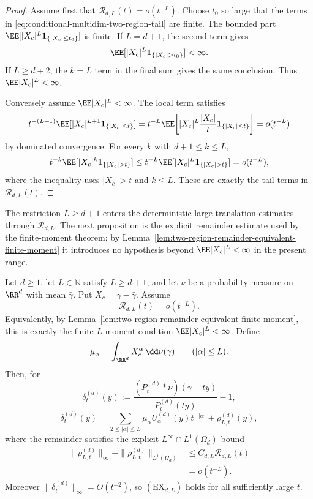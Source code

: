 \begin{proof}
Assume first that \(\mathcal R_{d,L}(t)=o(t^{-L})\).  Choose \(t_0\) so large
that the terms in \eqref{eq:conditional-multidim-two-region-tail} are finite.
The bounded part \(\EE[|X_c|^L{\bf1}_{\{|X_c|\le t_0\}}]\) is finite.  If
\(L=d+1\), the second term gives
\[
\EE[|X_c|^L{\bf1}_{\{|X_c|>t_0\}}]<\infty .
\]
If \(L\ge d+2\), the \(k=L\) term in the final sum gives the same conclusion.
Thus \(\EE|X_c|^L<\infty\).

Conversely assume \(\EE|X_c|^L<\infty\).  The local term satisfies
\[
t^{-(L+1)}\EE[|X_c|^{L+1}{\bf1}_{\{|X_c|\le t\}}]
=t^{-L}\EE\!\left[
|X_c|^L\frac{|X_c|}{t}{\bf1}_{\{|X_c|\le t\}}
\right]
=o(t^{-L})
\]
by dominated convergence.  For every \(k\) with \(d+1\le k\le L\),
\[
t^{-k}\EE[|X_c|^k{\bf1}_{\{|X_c|>t\}}]
\le
t^{-L}\EE[|X_c|^L{\bf1}_{\{|X_c|>t\}}]
=o(t^{-L}),
\]
where the inequality uses \(|X_c|>t\) and \(k\le L\).  These are exactly the
tail terms in \(\mathcal R_{d,L}(t)\).
\end{proof}

The restriction \(L\ge d+1\) enters the deterministic large-translation
estimates through \(\mathcal R_{d,L}\).  The next proposition is the explicit
remainder estimate used by the finite-moment theorem; by
Lemma~\ref{lem:two-region-remainder-equivalent-finite-moment} it introduces
no hypothesis beyond \(\EE|X_c|^L<\infty\) in the present range.

\begin{proposition}%
\label{thm:multidimensional-conditional-tail-density-quotient}
Let \(d\ge1\), let \(L\in\mathbb N\) satisfy \(L\ge d+1\), and let \(\nu\) be
a probability measure on \(\RR^d\) with mean \(\bar{\gamma}\).  Put
\(X_c=\gamma-\bar{\gamma}\).  Assume
\[
\mathcal R_{d,L}(t)=o(t^{-L}).
\]
Equivalently, by Lemma~\ref{lem:two-region-remainder-equivalent-finite-moment},
this is exactly the finite \(L\)-moment condition
\(\EE|X_c|^L<\infty\).  Define
\[
\begin{gathered}
\mu_\alpha=\int_{\RR^d}X_c^\alpha\,\dd\nu(\gamma)
\qquad(|\alpha|\le L).
\end{gathered}
\]
Then, for
\[
\delta_t^{(d)}(y):=
\frac{(P_t^{(d)}*\nu)(\bar{\gamma}+ty)}
{P_t^{(d)}(ty)}-1,
\]
\begin{equation}\label{eq:multidim-density-quotient-expansion-main}
\delta_t^{(d)}(y)=
\sum_{2\le|\alpha|\le L}\mu_\alpha U_\alpha^{(d)}(y)t^{-|\alpha|}
+\rho_{L,t}^{(d)}(y),
\end{equation}
where the remainder satisfies the explicit \(L^\infty\cap L^1(\Omega_d)\)
bound
\begin{equation}\label{eq:multidim-density-quotient-explicit-remainder}
\begin{aligned}
\|\rho_{L,t}^{(d)}\|_\infty+
\|\rho_{L,t}^{(d)}\|_{L^1(\Omega_d)}
&\le C_{d,L}\mathcal R_{d,L}(t)  \\
&=o(t^{-L}).
\end{aligned}
\end{equation}
Moreover \(\|\delta_t^{(d)}\|_\infty=O(t^{-2})\), so
\((\mathrm{EX}_{d,L})\) holds for all sufficiently large \(t\).
\end{proposition}

